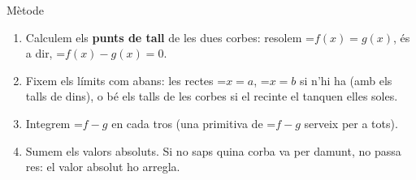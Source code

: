 \documentclass[11pt,a4paper]{article}
\newcommand{\fmm}[1]{\setbox0=\hbox{$#1$}\ifdim\wd0>\linewidth\[#1\]\else\mbox{\box0}\fi}
\begin{document}

  
\begin{fmprop}{Mètode}
\begin{enumerate}
\item Calculem els \textbf{punts de tall} de les dues corbes: resolem \fmm{f(x)=g(x)}, és a dir, \fmm{f(x)-g(x)=0}.
\item Fixem els límits com abans: les rectes \fmm{x=a}, \fmm{x=b} si n'hi ha (amb els talls de dins), o bé els talls de les corbes si el recinte el tanquen elles soles.
\item Integrem \fmm{f-g} en cada tros (una primitiva de \fmm{f-g} serveix per a tots).
\item Sumem els valors absoluts. Si no saps quina corba va per damunt, no passa res: el valor absolut ho arregla.
\end{enumerate}
\end{fmprop}
\end{document}
